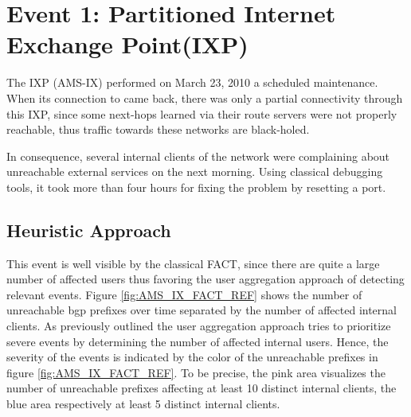\section{Event 1: Partitioned Internet Exchange Point(IXP)}

The IXP \citet{AMS-IX}(AMS-IX) performed on March 23, 2010 a scheduled 
maintenance. When its connection to \citet{switch} came back, there was only a 
partial connectivity through this IXP, since some next-hops learned via their 
route servers were not properly reachable, thus traffic towards these networks 
are black-holed.\citep{SchatzmannPAM2011}

In consequence, several internal clients of the \citet{switch} network were 
complaining about unreachable external services on the next morning. Using 
classical debugging tools, it took more than four hours for fixing the problem 
by resetting a port.\citep{SchatzmannPAM2011}

\subsection{Heuristic Approach} This event is well visible by the classical 
\gls{FACT}, since there are quite a large number of affected users thus favoring 
the user aggregation approach of detecting relevant events. 
Figure \ref{fig:AMS_IX_FACT_REF} shows the number of unreachable \gls{bgp} 
prefixes over time separated by the number of affected internal clients. As 
previously outlined the user aggregation approach tries to prioritize severe 
events by determining the number of affected internal users. 
Hence, the severity of the events is indicated by the color of the unreachable 
prefixes in figure \ref{fig:AMS_IX_FACT_REF}. To be precise, the pink area 
visualizes the number of unreachable prefixes affecting at least 10 distinct 
internal clients, the blue area respectively at least 5 distinct 
internal clients.

